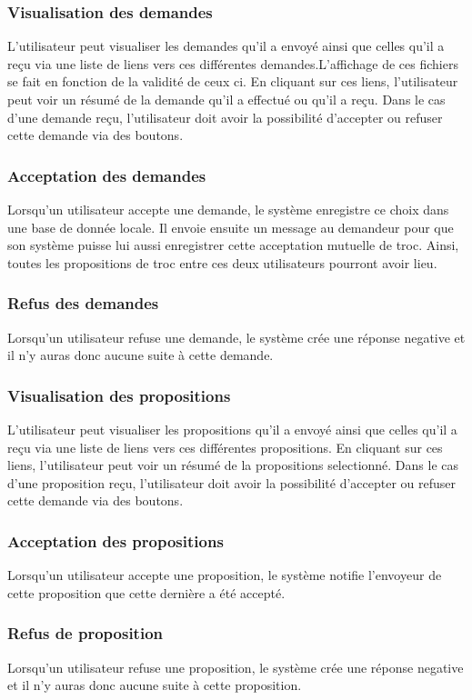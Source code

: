 \documentclass{article}
\begin{document}
\subsubsection{Visualisation des demandes}
L'utilisateur peut visualiser les demandes qu'il a envoyé ainsi que celles qu'il a reçu via une liste de liens vers ces différentes demandes.L'affichage de ces fichiers se fait en fonction de la validité de ceux ci. En cliquant sur ces liens, l'utilisateur peut voir un résumé de la demande qu'il a effectué ou qu'il a reçu. Dans le cas d'une demande reçu, l'utilisateur doit avoir la possibilité d'accepter ou refuser cette demande via des boutons.
\subsubsection{Acceptation des demandes}
Lorsqu'un utilisateur accepte une demande, le système enregistre ce choix dans une base de donnée locale. Il envoie ensuite un message au demandeur pour que son système puisse lui aussi enregistrer cette acceptation mutuelle de troc. Ainsi, toutes les propositions de troc entre ces deux utilisateurs pourront avoir lieu.

\subsubsection{Refus des demandes}
Lorsqu'un utilisateur refuse une demande, le système crée une réponse negative et il n'y auras donc aucune suite à cette demande.

\subsubsection{Visualisation des propositions}
L'utilisateur peut visualiser les propositions qu'il a envoyé ainsi que celles qu'il a reçu via une liste de liens vers ces différentes propositions. En cliquant sur ces liens, l'utilisateur peut voir un résumé de la propositions selectionné. Dans le cas d'une proposition reçu, l'utilisateur doit avoir la possibilité d'accepter ou refuser cette demande via des boutons.

\subsubsection{Acceptation des propositions}
Lorsqu'un utilisateur accepte une proposition, le système notifie l'envoyeur de cette proposition que cette dernière a été accepté.

\subsubsection{Refus de proposition}
Lorsqu'un utilisateur refuse une proposition, le système crée une réponse negative et il n'y auras donc aucune suite à cette proposition.
\end{document}
